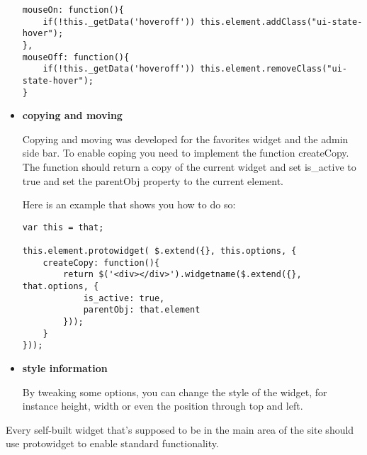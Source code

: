 \begin{itemize}
\begin{lstlisting}[caption=hover widget, label=lst:h2h:hoverwidget]
mouseOn: function(){
	if(!this._getData('hoveroff')) this.element.addClass("ui-state-hover");
},
mouseOff: function(){
	if(!this._getData('hoveroff')) this.element.removeClass("ui-state-hover");
}
\end{lstlisting}

        \item \textbf{copying and moving}

            Copying and moving was developed for the favorites widget and the admin side bar. To enable coping you need to implement the function createCopy. The function should return a copy of the current widget and set is\_active to true and set the parentObj property to the current element.

        Here is an example that shows you how to do so:
\begin{lstlisting}[caption=copy widget, label=lst:h2h:copywidget]
var this = that;

this.element.protowidget( $.extend({}, this.options, {
    createCopy: function(){
		return $('<div></div>').widgetname($.extend({}, that.options, {
			is_active: true,
			parentObj: that.element
		}));
	}
}));
\end{lstlisting}
        \item \textbf{style information}

            By tweaking some options, you can change the style of the widget, for instance height, width or even the position through top and left.
    \end{itemize}
    Every self-built widget that's supposed to be in the main area of the site should use protowidget to enable standard functionality.

